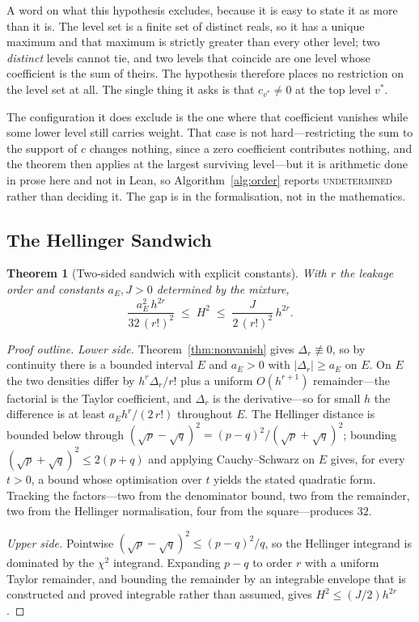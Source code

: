 \documentclass[conference]{IEEEtran}
\newtheorem{theorem}{Theorem}
\theoremstyle{definition}
\begin{document}
A word on what this hypothesis excludes, because it is easy to state it as more than it is.
The level set is a finite set of distinct reals, so it has a unique maximum and that maximum
is strictly greater than every other level; two \emph{distinct} levels cannot tie, and two
levels that coincide are one level whose coefficient is the sum of theirs. The hypothesis
therefore places no restriction on the level set at all. The single thing it asks is that
$c_{v^{*}}\neq0$ at the top level $v^{*}$.

The configuration it does exclude is the one where that coefficient vanishes while some lower
level still carries weight. That case is not hard---restricting the sum to the support of $c$
changes nothing, since a zero coefficient contributes nothing, and the theorem then applies
at the largest surviving level---but it is arithmetic done in prose here and not in Lean, so
Algorithm~\ref{alg:order} reports \textsc{undetermined} rather than deciding it. The gap is
in the formalisation, not in the mathematics.

\subsection{The Hellinger Sandwich}
\label{sec:sandwich}

\begin{theorem}[Two-sided sandwich with explicit constants]
\label{thm:sandwich}
With $r$ the leakage order and constants $a_{E},J>0$ determined by the mixture,
\begin{equation}
\frac{a_{E}^{2}\,h^{2r}}{32\,(r!)^{2}}\;\leq\;H^{2}\;\leq\;\frac{J}{2\,(r!)^{2}}\,h^{2r}.
\label{eq:sandwich}
\end{equation}
\end{theorem}

\begin{proof}[Proof outline]
\emph{Lower side.} Theorem~\ref{thm:nonvanish} gives $\Delta_{r}\not\equiv0$, so by
continuity there is a bounded interval $E$ and $a_{E}>0$ with $|\Delta_{r}|\ge a_{E}$ on
$E$. On $E$ the two densities differ by $h^{r}\Delta_{r}/r!$ plus a uniform $O(h^{r+1})$
remainder---the factorial is the Taylor coefficient, and $\Delta_{r}$ is the derivative---so
for small $h$ the difference is at least $a_{E}h^{r}/(2\,r!)$ throughout $E$. The
Hellinger distance is bounded below through
$(\sqrt{p}-\sqrt{q})^{2}=(p-q)^{2}/(\sqrt{p}+\sqrt{q})^{2}$; bounding
$(\sqrt{p}+\sqrt{q})^{2}\le2(p+q)$ and applying Cauchy--Schwarz on $E$ gives, for every
$t>0$, a bound whose optimisation over $t$ yields the stated quadratic form. Tracking the
factors---two from the denominator bound, two from the remainder, two from the Hellinger
normalisation, four from the square---produces $32$.

\emph{Upper side.} Pointwise $(\sqrt{p}-\sqrt{q})^{2}\le(p-q)^{2}/q$, so the Hellinger
integrand is dominated by the $\chi^{2}$ integrand. Expanding $p-q$ to order $r$ with a
uniform Taylor remainder, and bounding the remainder by an integrable envelope that is
constructed and proved integrable rather than assumed, gives $H^{2}\le(J/2)h^{2r}$.
\end{proof}
\end{document}
